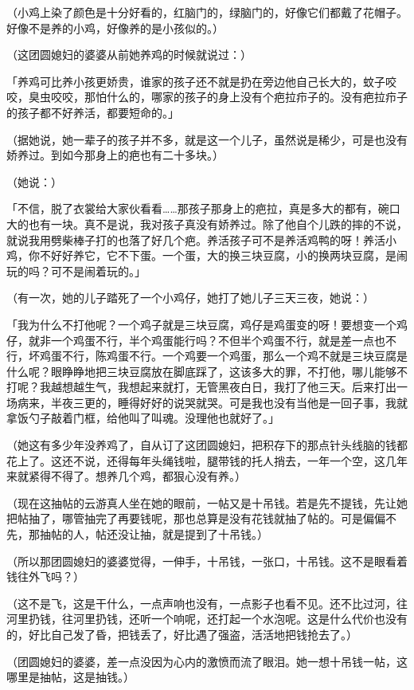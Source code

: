\documentclass[UTF8]{ctexart}
\begin{document}
（小鸡上染了颜色是十分好看的，红脑门的，绿脑门的，好像它们都戴了花帽子。好像不是养的小鸡，好像养的是小孩似的。）

（这团圆媳妇的婆婆从前她养鸡的时候就说过：）

「养鸡可比养小孩更娇贵，谁家的孩子还不就是扔在旁边他自己长大的，蚊子咬咬，臭虫咬咬，那怕什么的，哪家的孩子的身上没有个疤拉疖子的。没有疤拉疖子的孩子都不好养活，都要短命的。」

（据她说，她一辈子的孩子并不多，就是这一个儿子，虽然说是稀少，可是也没有娇养过。到如今那身上的疤也有二十多块。）

（她说：）

「不信，脱了衣裳给大家伙看看……那孩子那身上的疤拉，真是多大的都有，碗口大的也有一块。真不是说，我对孩子真没有娇养过。除了他自个儿跌的摔的不说，就说我用劈柴棒子打的也落了好几个疤。养活孩子可不是养活鸡鸭的呀！养活小鸡，你不好好养它，它不下蛋。一个蛋，大的换三块豆腐，小的换两块豆腐，是闹玩的吗？可不是闹着玩的。」

（有一次，她的儿子踏死了一个小鸡仔，她打了她儿子三天三夜，她说：）

「我为什么不打他呢？一个鸡子就是三块豆腐，鸡仔是鸡蛋变的呀！要想变一个鸡仔，就非一个鸡蛋不行，半个鸡蛋能行吗？不但半个鸡蛋不行，就是差一点也不行，坏鸡蛋不行，陈鸡蛋不行。一个鸡要一个鸡蛋，那么一个鸡不就是三块豆腐是什么呢？眼睁睁地把三块豆腐放在脚底踩了，这该多大的罪，不打他，哪儿能够不打呢？我越想越生气，我想起来就打，无管黑夜白日，我打了他三天。后来打出一场病来，半夜三更的，睡得好好的说哭就哭。可是我也没有当他是一回子事，我就拿饭勺子敲着门框，给他叫了叫魂。没理他也就好了。」

（她这有多少年没养鸡了，自从订了这团圆媳妇，把积存下的那点针头线脑的钱都花上了。这还不说，还得每年头绳钱啦，腿带钱的托人捎去，一年一个空，这几年来就紧得不得了。想养几个鸡，都狠心没有养。）

（现在这抽帖的云游真人坐在她的眼前，一帖又是十吊钱。若是先不提钱，先让她把帖抽了，哪管抽完了再要钱呢，那也总算是没有花钱就抽了帖的。可是偏偏不先，那抽帖的人，帖还没让抽，就是提到了十吊钱。）

（所以那团圆媳妇的婆婆觉得，一伸手，十吊钱，一张口，十吊钱。这不是眼看着钱往外飞吗？）

（这不是飞，这是干什么，一点声响也没有，一点影子也看不见。还不比过河，往河里扔钱，往河里扔钱，还听一个响呢，还打起一个水泡呢。这是什么代价也没有的，好比自己发了昏，把钱丢了，好比遇了强盗，活活地把钱抢去了。）

（团圆媳妇的婆婆，差一点没因为心内的激愤而流了眼泪。她一想十吊钱一帖，这哪里是抽帖，这是抽钱。）
\end{document}
